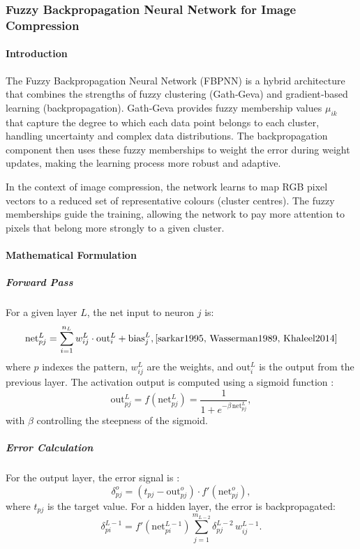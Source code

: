 \subsubsection{Fuzzy Backpropagation Neural Network for Image Compression}

\paragraph{Introduction}
The Fuzzy Backpropagation Neural Network (FBPNN) is a hybrid architecture that combines the strengths of fuzzy clustering (Gath‑Geva) and gradient‑based learning (backpropagation). Gath‑Geva provides fuzzy membership values $\mu_{ik}$ that capture the degree to which each data point belongs to each cluster, handling uncertainty and complex data distributions. The backpropagation component then uses these fuzzy memberships to weight the error during weight updates, making the learning process more robust and adaptive.

In the context of image compression, the network learns to map RGB pixel vectors to a reduced set of representative colours (cluster centres). The fuzzy memberships guide the training, allowing the network to pay more attention to pixels that belong more strongly to a given cluster.

\paragraph{Mathematical Formulation}

\subparagraph{Forward Pass}
For a given layer $L$, the net input to neuron $j$ is:
\[
 \text{net}_{pj}^{L} = \sum_{i=1}^{n_{L}} w_{ij}^{L} \cdot \text{out}_{i}^{L} + \text{bias}_{j}^{L}, \cite{sarkar1995, Wasserman1989, Khaleel2014}
\]
where $p$ indexes the pattern, $w_{ij}^{L}$ are the weights, and $\text{out}_{i}^{L}$ is the output from the previous layer. The activation output is computed using a sigmoid function \cite{sarkar1995, Wasserman1989, Khaleel2014}:
\[
\text{out}_{pj}^{L} = f(\text{net}_{pj}^{L}) = \frac{1}{1 + e^{-\beta \,\text{net}_{pj}^{L}}},
\]
with $\beta$ controlling the steepness of the sigmoid.

\subparagraph{Error Calculation}
For the output layer, the error signal is \cite{sarkar1995, Wasserman1989, Khaleel2014}:
\[
\delta_{pj}^{o} = (t_{pj} - \text{out}_{pj}^{o}) \cdot f'(\text{net}_{pj}^{o}),
\]
where $t_{pj}$ is the target value. For a hidden layer, the error is backpropagated:
\[
\delta_{pi}^{L-1} = f'(\text{net}_{pi}^{L-1}) \sum_{j=1}^{m_{L-2}} \delta_{pj}^{L-2} \, w_{ij}^{L-1}.
\]

